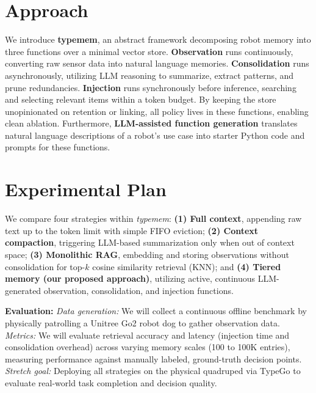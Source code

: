 \documentclass[11pt]{article}
\begin{document}
\section{Approach}

We introduce \textbf{typemem}, an abstract framework decomposing robot memory into three functions over a minimal vector store. \textbf{Observation} runs continuously, converting raw sensor data into natural language memories. \textbf{Consolidation} runs asynchronously, utilizing LLM reasoning to summarize, extract patterns, and prune redundancies. \textbf{Injection} runs synchronously before inference, searching and selecting relevant items within a token budget. By keeping the store unopinionated on retention or linking, all policy lives in these functions, enabling clean ablation. Furthermore, \textbf{LLM-assisted function generation} translates natural language descriptions of a robot's use case into starter Python code and prompts for these functions.

\section{Experimental Plan}

We compare four strategies within \textit{typemem}: \textbf{(1) Full context}, appending raw text up to the token limit with simple FIFO eviction; \textbf{(2) Context compaction}, triggering LLM-based summarization only when out of context space; \textbf{(3) Monolithic RAG}, embedding and storing observations without consolidation for top-$k$ cosine similarity retrieval (KNN); and \textbf{(4) Tiered memory (our proposed approach)}, utilizing active, continuous LLM-generated observation, consolidation, and injection functions. 

\textbf{Evaluation:} \textit{Data generation:} We will collect a continuous offline benchmark by physically patrolling a Unitree Go2 robot dog to gather observation data. \textit{Metrics:} We will evaluate retrieval accuracy and latency (injection time and consolidation overhead) across varying memory scales (100 to 100K entries), measuring performance against manually labeled, ground-truth decision points. \textit{Stretch goal:} Deploying all strategies on the physical quadruped via TypeGo to evaluate real-world task completion and decision quality. 
\end{document}
